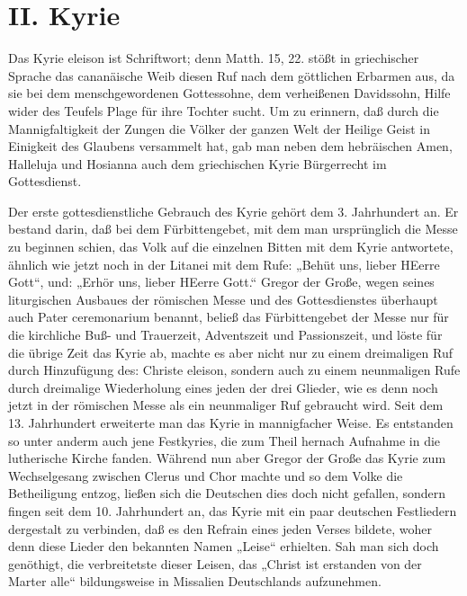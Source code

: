 \chapter{II. Kyrie}


Das Kyrie eleison ist Schriftwort; denn Matth. 15, 22. stößt in griechischer Sprache das cananäische Weib diesen Ruf nach dem göttlichen Erbarmen aus, da sie bei dem menschgewordenen Gottessohne, dem verheißenen Davidssohn, Hilfe wider des Teufels Plage für ihre Tochter sucht. Um zu erinnern, daß durch die Mannigfaltigkeit der Zungen die Völker der ganzen Welt der Heilige Geist in Einigkeit des Glaubens versammelt hat, gab man neben dem hebräischen Amen, Halleluja und Hosianna auch dem griechischen Kyrie Bürgerrecht im Gottesdienst.

Der erste gottesdienstliche Gebrauch des Kyrie gehört dem 3. Jahrhundert an. Er bestand darin, daß bei dem Fürbittengebet, mit dem man ursprünglich die Messe zu beginnen schien, das Volk auf die einzelnen Bitten mit dem Kyrie antwortete, ähnlich wie jetzt noch in der Litanei mit dem Rufe: „Behüt uns, lieber HEerre Gott“, und: „Erhör uns, lieber HEerre Gott.“ Gregor der Große, wegen seines liturgischen Ausbaues der römischen Messe und des Gottesdienstes überhaupt auch Pater ceremonarium benannt, beließ das Fürbittengebet der Messe nur für die kirchliche Buß- und Trauerzeit, Adventszeit und Passionszeit, und löste für die übrige Zeit das Kyrie ab, machte es aber nicht nur zu einem dreimaligen Ruf durch Hinzufügung des: Christe eleison, sondern auch zu einem neunmaligen Rufe durch dreimalige Wiederholung eines jeden der drei Glieder, wie es denn noch jetzt in der römischen Messe als ein neunmaliger Ruf gebraucht wird. Seit dem 13. Jahrhundert erweiterte man das Kyrie in mannigfacher Weise. Es entstanden so unter anderm auch jene Festkyries, die zum Theil hernach Aufnahme in die lutherische Kirche fanden. Während nun aber Gregor der Große das Kyrie zum Wechselgesang zwischen Clerus und Chor machte und so dem Volke die Betheiligung entzog, ließen sich die Deutschen dies doch nicht gefallen, sondern fingen seit dem 10. Jahrhundert an, das Kyrie mit ein paar deutschen Festliedern dergestalt zu verbinden, daß es den Refrain eines jeden Verses bildete, woher denn diese Lieder den bekannten Namen „Leise“ erhielten. Sah man sich doch genöthigt, die verbreitetste dieser Leisen, das „Christ ist erstanden von der Marter alle“ bildungsweise in Missalien Deutschlands aufzunehmen.


